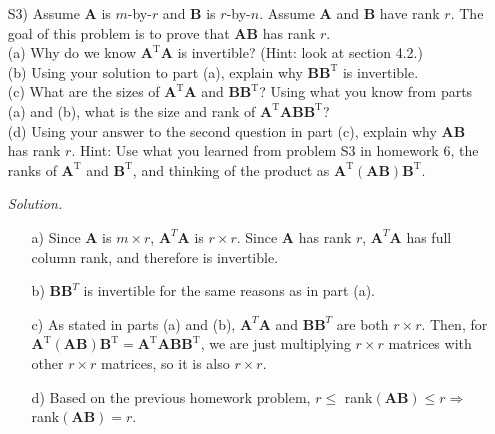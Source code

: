 \documentclass[12pt]{article}
\begin{document}
\begin{itemize}
\item[S3)]  Assume $\mathbf{A}$ is $m$-by-$r$ and $\mathbf{B}$ is $r$-by-$n$.  Assume $\mathbf{A}$ and $\mathbf{B}$ have rank $r$.  The goal of this problem is to prove that $\mathbf{AB}$ has rank $r$.  \\
(a) Why do we know $\mathbf{A}^\text{T}\mathbf{A}$ is invertible? (Hint: look at section 4.2.) \\
(b) Using your solution to part (a), explain why $\mathbf{B}\mathbf{B}^\text{T}$ is invertible. \\
(c) What are the sizes of $\mathbf{A}^\text{T}\mathbf{A}$ and $\mathbf{B}\mathbf{B}^\text{T}$?  Using what you know from parts (a) and (b), what is the size and rank of $\mathbf{A}^\text{T}\mathbf{A}\mathbf{B}\mathbf{B}^\text{T}$?\\
(d) Using your answer to the second question in part (c), explain why $\mathbf{AB}$ has rank $r$.  Hint: Use what you learned from problem S3 in homework 6, the ranks of $\mathbf{A}^\text{T}$ and  $\mathbf{B}^\text{T}$, and thinking of the product as $\mathbf{A}^\text{T}(\mathbf{A}\mathbf{B})\mathbf{B}^\text{T}$. 

\textit{Solution.}
\begin{itemize}
\item[a)] Since $\mathbf{A}$ is $m \times r$, $\mathbf{A}^T\mathbf{A}$ is $r \times r$. Since $\mathbf{A}$ has rank $r$, $\mathbf{A}^T\mathbf{A}$ has full column rank, and therefore is invertible.
\item[b)] $\mathbf{B}\mathbf{B}^T$ is invertible for the same reasons as in part (a).
\item[c)] As stated in parts (a) and (b), $\mathbf{A}^T\mathbf{A}$ and $\mathbf{B}\mathbf{B}^T$ are both $r \times r$. Then, for  $\mathbf{A}^\text{T}(\mathbf{A}\mathbf{B})\mathbf{B}^\text{T}=\mathbf{A}^\text{T}\mathbf{A}\mathbf{B}\mathbf{B}^\text{T}$, we are just multiplying $r \times r$ matrices with other $r \times r$ matrices, so it is also $r \times r$.
\item[d)] Based on the previous homework problem, $r \leq$ rank$(\mathbf{A}\mathbf{B}) \leq r \Rightarrow$ rank$(\mathbf{A}\mathbf{B})=r$.
\end{itemize}

\end{itemize}
\end{document}
